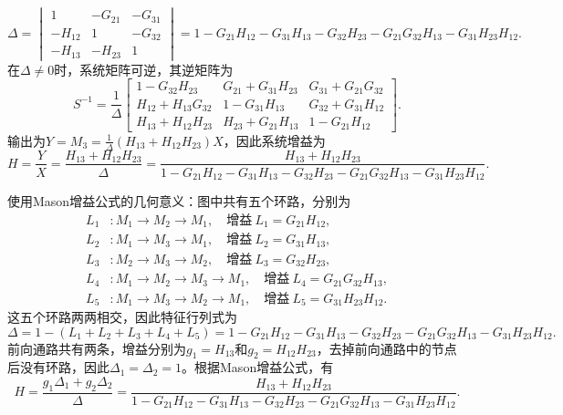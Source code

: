 \begin{example}[单入单出信号流图]
\begin{equation}
        \Delta=\begin{vmatrix}
            1 & -G_{21} & -G_{31} \\
            -H_{12} & 1 & -G_{32} \\
            -H_{13} & -H_{23} & 1
        \end{vmatrix}=1-G_{21}H_{12}-G_{31}H_{13}-G_{32}H_{23}-G_{21}G_{32}H_{13}-G_{31}H_{23}H_{12}.
    \end{equation}
    在$\Delta\neq 0$时，系统矩阵可逆，其逆矩阵为
    \begin{equation}
        S^{-1}=\frac{1}{\Delta}\begin{bmatrix}
            1-G_{32}H_{23} & G_{21}+G_{31}H_{23} & G_{31}+G_{21}G_{32} \\
            H_{12}+H_{13}G_{32} & 1-G_{31}H_{13} & G_{32}+G_{31}H_{12} \\
            H_{13}+H_{12}H_{23} & H_{23}+G_{21}H_{13} & 1-G_{21}H_{12}
        \end{bmatrix}.
    \end{equation}
    输出为$\displaystyle Y=M_3=\frac{1}{\Delta}(H_{13}+H_{12}H_{23})X$，因此系统增益为
    \begin{equation}
        H=\frac{Y}{X}=\frac{H_{13}+H_{12}H_{23}}{\Delta}=\frac{H_{13}+H_{12}H_{23}}{1-G_{21}H_{12}-G_{31}H_{13}-G_{32}H_{23}-G_{21}G_{32}H_{13}-G_{31}H_{23}H_{12}}.
    \end{equation}

     使用Mason增益公式的几何意义：图中共有五个环路，分别为
    \begin{equation}
        \begin{aligned}
            L_1&:M_1\to M_2\to M_1,\quad \text{增益}\ L_1=G_{21}H_{12},\\
            L_2&:M_1\to M_3\to M_1,\quad \text{增益}\ L_2=G_{31}H_{13},\\
            L_3&:M_2\to M_3\to M_2,\quad \text{增益}\ L_3=G_{32}H_{23},\\
            L_4&:M_1\to M_2\to M_3\to M_1,\quad \text{增益}\ L_4=G_{21}G_{32}H_{13},\\
            L_5&:M_1\to M_3\to M_2\to M_1,\quad \text{增益}\ L_5=G_{31}H_{23}H_{12}.
        \end{aligned}
    \end{equation}
    这五个环路两两相交，因此特征行列式为
    \begin{equation}
        \Delta=1-(L_1+L_2+L_3+L_4+L_5)=1-G_{21}H_{12}-G_{31}H_{13}-G_{32}H_{23}-G_{21}G_{32}H_{13}-G_{31}H_{23}H_{12}.
    \end{equation}
    前向通路共有两条，增益分别为$g_1=H_{13}$和$g_2=H_{12}H_{23}$，去掉前向通路中的节点后没有环路，因此$\Delta_1=\Delta_2=1$。根据Mason增益公式，有
    \begin{equation}
        H=\frac{g_1\Delta_1+g_2\Delta_2}{\Delta}=\frac{H_{13}+H_{12}H_{23}}{1-G_{21}H_{12}-G_{31}H_{13}-G_{32}H_{23}-G_{21}G_{32}H_{13}-G_{31}H_{23}H_{12}}.
    \end{equation}
\end{example}


